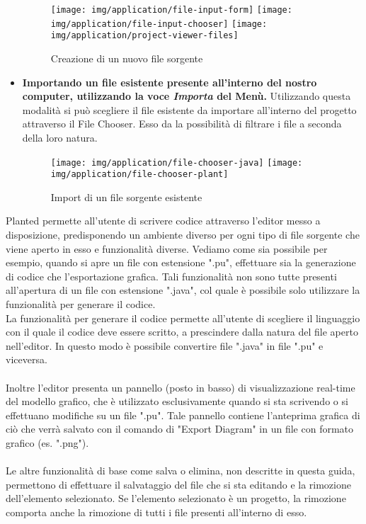 \documentclass{article}
\begin{document}
\begin{appendices}
\begin{itemize}
      \begin{figure}[H]
        \centering
        \begin{framed}
          \texttt{[image: img/application/file-input-form]}
          \texttt{[image: img/application/file-input-chooser]}
          \texttt{[image: img/application/project-viewer-files]}
        \end{framed}
        \caption{Creazione di un nuovo file sorgente}
      \end{figure}
      \item \textbf{Importando un file esistente presente all'interno del nostro computer, utilizzando la voce \textit{Importa} del Menù.} Utilizzando questa modalità
      si può scegliere il file esistente da importare all'interno del progetto attraverso il File Chooser. Esso da la possibilità di filtrare i file a seconda
      della loro natura.
      \begin{figure}[H]
        \centering
        \begin{framed}
          \texttt{[image: img/application/file-chooser-java]}
          \texttt{[image: img/application/file-chooser-plant]}
        \end{framed}
        \caption{Import di un file sorgente esistente}
      \end{figure}
    \end{itemize}
    Planted permette all'utente di scrivere codice attraverso l'editor messo a disposizione, predisponendo un ambiente diverso per ogni tipo di file sorgente
    che viene aperto in esso e funzionalità diverse.
    Vediamo come sia possibile per esempio, quando si apre un file con estensione ".pu", effettuare sia la generazione di codice che l'esportazione grafica.
    Tali funzionalità non sono tutte presenti all'apertura di un file con estensione ".java", col quale è possibile solo utilizzare la funzionalità per generare
    il codice.\\La funzionalità per generare il codice permette all'utente di scegliere il linguaggio con il quale il codice deve essere scritto, a prescindere
    dalla natura del file aperto nell'editor. In questo modo è possibile convertire file ".java" in file ".pu" e viceversa.\\
    \\Inoltre l'editor presenta un pannello (posto in basso) di visualizzazione real-time del modello grafico, che è utilizzato esclusivamente quando si
    sta scrivendo o si effettuano modifiche su un file ".pu". Tale pannello contiene l'anteprima grafica di ciò che verrà salvato con il comando di "Export Diagram"
    in un file con formato grafico (es. ".png").\\
    \\Le altre funzionalità di base come salva o elimina, non descritte in questa guida, permettono di effettuare il salvataggio del file che si sta editando
    e la rimozione dell'elemento selezionato. Se l'elemento selezionato è un progetto, la rimozione comporta anche la rimozione di tutti i file presenti
    all'interno di esso.
  \end{appendices}
\end{document}
